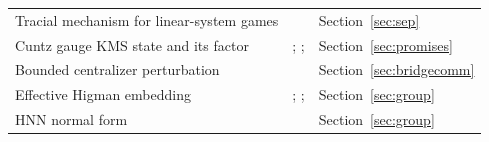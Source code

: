 \begin{center}
\begin{minipage}{\linewidth}
\begin{tabular}{@{}>{\raggedright\arraybackslash}p{.40\linewidth}>{\raggedright\arraybackslash}p{.27\linewidth}>{\raggedright\arraybackslash}p{.25\linewidth}@{}}
Tracial mechanism for linear-system games & \cite[Proposition~7.4]{ReadType} & Section~\ref{sec:sep}\\
Cuntz gauge KMS state and its factor & \cite{OP}; \cite[Theorem~4.9, Example~4.13]{HarrisEmbezzlement}; \cite[Section~3.1]{ReadType} & Section~\ref{sec:promises}\\
Bounded centralizer perturbation & \cite[Lemma~4.5]{PT} & Section~\ref{sec:bridgecomm}\\
Effective Higman embedding & \cite{Higman}; \cite[Theorem~2.2]{Chiodo}; \cite{Craig} & Section~\ref{sec:group}\\
HNN normal form & \cite{HNN} & Section~\ref{sec:group}\\
\bottomrule
\end{tabular}
\end{minipage}
\end{center}

